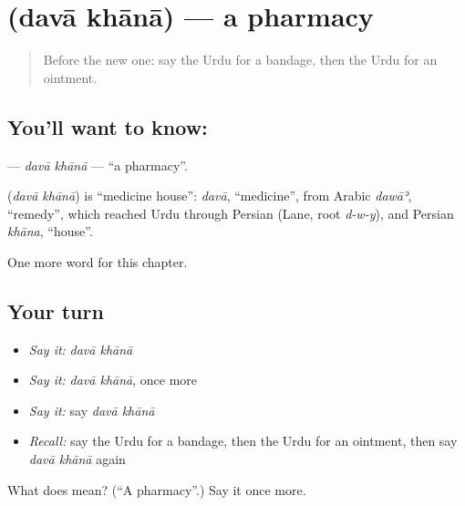 \section[\texorpdfstring{\ur{دوا} \ur{خانہ} (davā khānā)}{دوا خانہ (davā khānā)}]{  (davā khānā) — a pharmacy}

\label{lesson:UR-C244-dava-khana}



\begin{quote}
Before the new one: say the Urdu for a bandage, then the Urdu for an ointment.
\end{quote}

\subsection*{You'll want to know:  }
\textbf{ } — \emph{davā khānā} — \textquotedblleft{}a pharmacy\textquotedblright{}.

\begin{cousinweb}
\textbf{ } (\emph{davā khānā}) is \textquotedblleft{}medicine house\textquotedblright{}: \emph{davā}, \textquotedblleft{}medicine\textquotedblright{}, from Arabic \emph{dawāʾ}, \textquotedblleft{}remedy\textquotedblright{}, which reached Urdu through Persian (Lane, root \emph{d-w-y}), and Persian \emph{khāna}, \textquotedblleft{}house\textquotedblright{}.
\end{cousinweb}

\begin{grammarlens}[title={What you've built}]
One more word for this chapter.
\end{grammarlens}

\subsection*{Your turn}
\begin{itemize}
\raggedright
  \item \emph{Say it:} \emph{davā khānā}
  \item \emph{Say it:} \emph{davā khānā}, once more
  \item \emph{Say it:} say \emph{davā khānā}
  \item \emph{Recall:} say the Urdu for a bandage, then the Urdu for an ointment, then say \emph{davā khānā} again
\end{itemize}

\begin{tcolorbox}[breakable,colback=teal!4,colframe=teal!35!black,title={Before you move on}]
What does   mean? (\textquotedblleft{}A pharmacy\textquotedblright{}.) Say it once more.
\end{tcolorbox}
